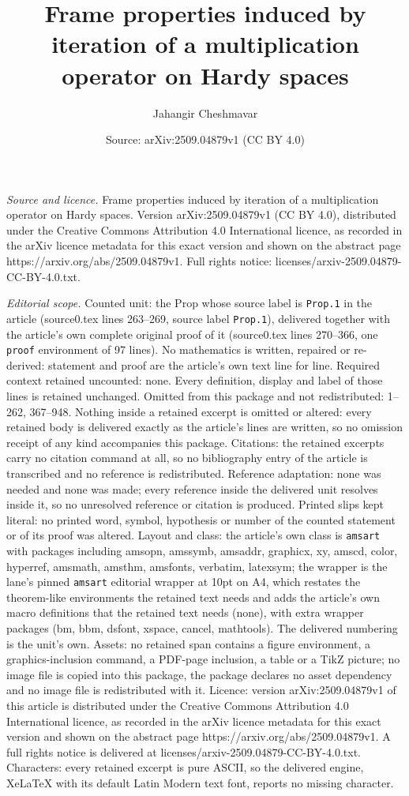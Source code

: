 \documentclass[10pt,a4paper]{amsart}
\title[Frame properties induced by iteration of a multiplication op]{Frame properties induced by iteration of a multiplication operator on Hardy spaces}
\author{Jahangir Cheshmavar}
\date{Source: arXiv:2509.04879v1 (CC BY 4.0)}
\begin{document}
\maketitle

\noindent\emph{Source and licence.} Frame properties induced by iteration of a multiplication operator on Hardy spaces. Version arXiv:2509.04879v1 (CC BY 4.0), distributed under the Creative Commons Attribution 4.0 International licence, as recorded in the arXiv licence metadata for this exact version and shown on the abstract page https://arxiv.org/abs/2509.04879v1. Full rights notice: licenses/arxiv-2509.04879-CC-BY-4.0.txt.\par\smallskip

\noindent\textit{Editorial scope.} Counted unit: the Prop whose source label is \texttt{Prop.1} in the article (source0.tex lines 263--269, source label \texttt{Prop.1}), delivered together with the article's own complete original proof of it (source0.tex lines 270--366, one \texttt{proof} environment of 97 lines). No mathematics is written, repaired or re-derived: statement and proof are the article's own text line for line. Required context retained uncounted: none. Every definition, display and label of those lines is retained unchanged. Omitted from this package and not redistributed: 1--262, 367--948. Nothing inside a retained excerpt is omitted or altered: every retained body is delivered exactly as the article's lines are written, so no omission receipt of any kind accompanies this package. Citations: the retained excerpts carry no citation command at all, so no bibliography entry of the article is transcribed and no reference is redistributed. Reference adaptation: none was needed and none was made; every reference inside the delivered unit resolves inside it, so no unresolved reference or citation is produced. Printed slips kept literal: no printed word, symbol, hypothesis or number of the counted statement or of its proof was altered. Layout and class: the article's own class is \texttt{amsart} with packages including amsopn, amssymb, amsaddr, graphicx, xy, amscd, color, hyperref, amsmath, amsthm, amsfonts, verbatim, latexsym; the wrapper is the lane's pinned \texttt{amsart} editorial wrapper at 10pt on A4, which restates the theorem-like environments the retained text needs and adds the article's own macro definitions that the retained text needs (none), with extra wrapper packages (bm, bbm, dsfont, xspace, cancel, mathtools). The delivered numbering is the unit's own. Assets: no retained span contains a figure environment, a graphics-inclusion command, a PDF-page inclusion, a table or a TikZ picture; no image file is copied into this package, the package declares no asset dependency and no image file is redistributed with it. Licence: version arXiv:2509.04879v1 of this article is distributed under the Creative Commons Attribution 4.0 International licence, as recorded in the arXiv licence metadata for this exact version and shown on the abstract page https://arxiv.org/abs/2509.04879v1. A full rights notice is delivered at licenses/arxiv-2509.04879-CC-BY-4.0.txt. Characters: every retained excerpt is pure ASCII, so the delivered engine, XeLaTeX with its default Latin Modern text font, reports no missing character.
\end{document}
